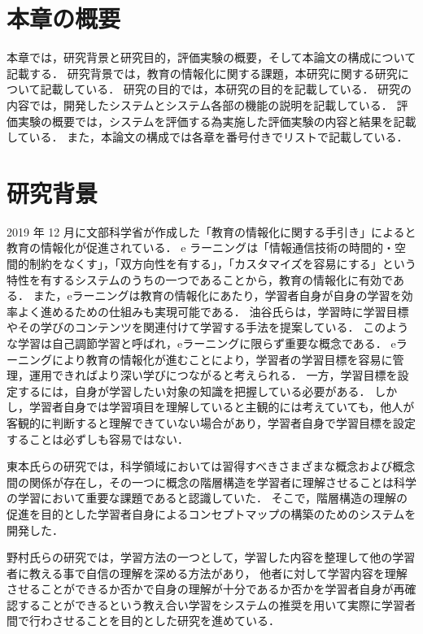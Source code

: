 \section{本章の概要}
本章では，研究背景と研究目的，評価実験の概要，そして本論文の構成について記載する．
研究背景では，教育の情報化に関する課題，本研究に関する研究について記載している．
研究の目的では，本研究の目的を記載している．
研究の内容では，開発したシステムとシステム各部の機能の説明を記載している．
評価実験の概要では，システムを評価する為実施した評価実験の内容と結果を記載している．
また，本論文の構成では各章を番号付きでリストで記載している．

\section{研究背景}
2019 年 12 月に文部科学省が作成した「教育の情報化に関する手引き」\cite{tebiki}によると教育の情報化が促進されている．
e ラーニング\cite{e}は「情報通信技術の時間的・空間的制約をなくす」，「双方向性を有する」，「カスタマイズを容易にする」という特性を有するシステムのうちの一つであることから，教育の情報化に有効である．
また，eラーニングは教育の情報化にあたり，学習者自身が自身の学習を効率よく進めるための仕組みも実現可能である．
油谷氏らは，学習時に学習目標やその学びのコンテンツを関連付けて学習する手法を提案している\cite{seman}．
このような学習は自己調節学習と呼ばれ，eラーニングに限らず重要な概念である\cite{jikotyou}．
eラーニングにより教育の情報化が進むことにより，学習者の学習目標を容易に管理，運用できればより深い学びにつながると考えられる．
一方，学習目標を設定するには，自身が学習したい対象の知識を把握している必要がある．
しかし，学習者自身では学習項目を理解していると主観的には考えていても，他人が客観的に判断すると理解できていない場合があり，学習者自身で学習目標を設定することは必ずしも容易ではない．

東本氏らの研究では，科学領域においては習得すべきさまざまな概念および概念間の関係が存在し，その一つに概念の階層構造を学習者に理解させることは科学の学習において重要な課題であると認識していた．
そこで，階層構造の理解の促進を目的とした学習者自身によるコンセプトマップ\cite{concept}の構築のためのシステムを開発した\cite{toumoto}．

野村氏らの研究では，学習方法の一つとして，学習した内容を整理して他の学習者に教える事で自信の理解を深める方法があり，
他者に対して学習内容を理解させることができるか否かで自身の理解が十分であるか否かを学習者自身が再確認することができるという教え合い学習をシステムの推奨を用いて実際に学習者間で行わさせることを目的とした研究を進めている\cite{nomura}．

